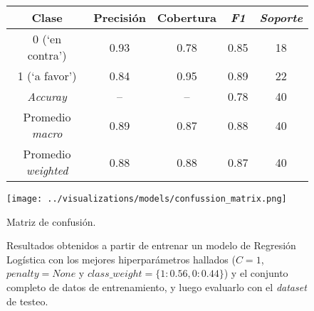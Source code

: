 \begin{figure}
    \begin{minipage}[b]{.6\linewidth}
    \centering
        \begin{adjustbox}{max width=\textwidth}
        \begin{tabular}{ *{5}{|c}| }
        \hline
        Clase & Precisi\'on & Cobertura & \textit{F1} & \textit{Soporte} \\
        \hline{} (`en contra') & 0.93 & 0.78 & 0.85 & 18 \\
         (`a favor') & 0.84 & 0.95 & 0.89  & 22 \\
        \hline\hline
        \textit{Accuray} & {--} & {--} & 0.78 & 40 \\
        \hline
        Promedio \textit{macro} & 0.89 & 0.87 & 0.88 & 40 \\
        \hline
        Promedio \textit{weighted} & 0.88 & 0.88 & 0.87 & 40 \\
        \hline
        \end{tabular}
        \end{adjustbox}
        \label{table-results-models-held-out}
    \end{minipage}\hfill
    \begin{minipage}[t]{.35\linewidth}
      \centering
        \texttt{[image: ../visualizations/models/confussion\_matrix.png]}
        \caption{Matriz de confusi\'on.}
        \label{fig-results-models-held-out}
    \end{minipage}
    \caption*{Resultados obtenidos a partir de entrenar un modelo de
    Regresi\'on Log\'istica con los mejores hiperpar\'ametros hallados
    ($C=1$, $penalty=None$ y $class\_weight=\lbrace1:0.56,0:0.44\rbrace$)
    y el conjunto completo de datos de entrenamiento,
    y luego evaluarlo con el \textit{dataset} de testeo.}
  \end{figure}

